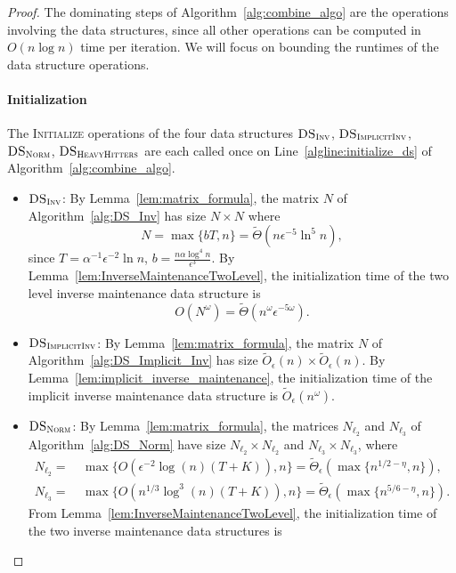 \documentclass[11pt]{article}
\newcommand\NN{\boldsymbol{\mathit{N}}}
\newcommand\Otil{\widetilde{O}}
\newcommand{\wt}{\widetilde}
\begin{document}
\begin{proof}
The dominating steps of Algorithm~\ref{alg:combine_algo} are the operations involving the data structures, since all other operations can be computed in $O(n \log n)$ time per iteration. We will focus on bounding the runtimes of the data structure operations.

\paragraph{Initialization} The \textsc{Initialize} operations of the four data structures $\textsc{DS}_{\textsc{Inv}}$, $\textsc{DS}_{\textsc{ImplicitInv}}$, $\textsc{DS}_{\textsc{Norm}}$, $\textsc{DS}_{\textsc{HeavyHitters}}$ are each called once on Line~\ref{algline:initialize_ds} of Algorithm~\ref{alg:combine_algo}.
\begin{itemize}
\item $\textsc{DS}_{\textsc{Inv}}$: By Lemma~\ref{lem:matrix_formula}, the matrix $\NN$ of Algorithm~\ref{alg:DS_Inv} has size $N \times N$ where
\[
N = \max\{bT, n\} = \widetilde{\Theta}(n \epsilon^{-5} \ln^5 n),
\]
since $T = \alpha^{-1}\epsilon^{-2}\ln n$,  $b = \frac{n \alpha \log^4 n}{\epsilon^3}$. By Lemma~\ref{lem:InverseMaintenanceTwoLevel}, the initialization time of the two level inverse maintenance data structure is 
\[
O(N^{\omega}) = \widetilde{\Theta}(n^{\omega} \epsilon^{-5 \omega}).
\]
\item $\textsc{DS}_{\textsc{ImplicitInv}}$: By Lemma~\ref{lem:matrix_formula}, the matrix $\NN$ of Algorithm~\ref{alg:DS_Implicit_Inv} has size $\Otil_{\epsilon}(n) \times \Otil_{\epsilon}(n)$. By Lemma~\ref{lem:implicit_inverse_maintenance}, the initialization time of the implicit inverse maintenance data structure is $\Otil_{\epsilon}(n^{\omega})$.
\item $\textsc{DS}_{\textsc{Norm}}$: By Lemma~\ref{lem:matrix_formula}, the matrices $\NN_{\ell_2}$ and $\NN_{\ell_3}$ of Algorithm~\ref{alg:DS_Norm} have size $N_{\ell_2} \times N_{\ell_2}$ and $N_{\ell_3} \times N_{\ell_3}$, where
\begin{align*}
N_{\ell_2} = &~ \max\{O(\epsilon^{-2} \log(n) (T+K)), n\} = \wt{\Theta}_{\epsilon}(\max\{n^{1/2-\eta} , n\}), \\
N_{\ell_3} = &~ \max\{O(n^{1/3} \log^3(n) (T+K)), n\} = \wt{\Theta}_{\epsilon}(\max\{n^{5/6 - \eta}, n\}).
\end{align*} 
From Lemma~\ref{lem:InverseMaintenanceTwoLevel}, the initialization time of the two inverse maintenance data structures is
\[
\]
\end{itemize}
\end{proof}
\end{document}
